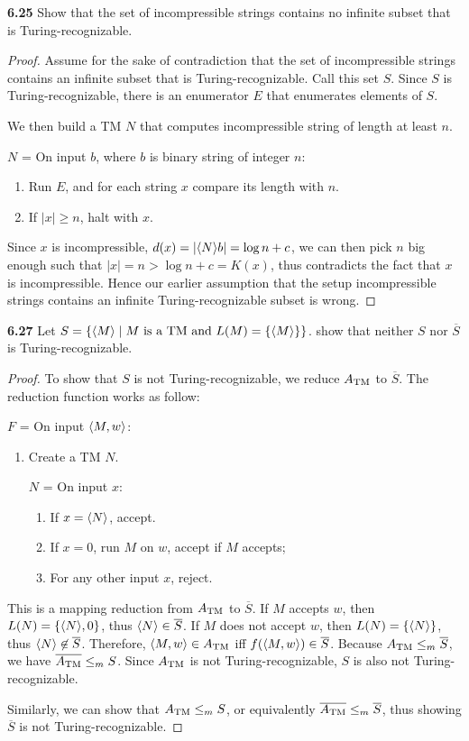 \textbf{6.25} Show that the set of incompressible strings contains no infinite subset that is Turing-recognizable.
\begin{mdframed}
\begin{proof}
Assume for the sake of contradiction that the set of incompressible strings contains an infinite subset that is Turing-recognizable. Call this set $S$. Since $S$ is Turing-recognizable, there is an enumerator $E$ that enumerates elements of $S$.

We then build a TM $N$ that computes incompressible string of length at least $n$.

\medskip
$N$ = On input $b$, where $b$ is binary string of integer $n$:
\begin{enumerate}
\item Run $E$, and for each string $x$ compare its length with $n$.
\item If $|x| \geq n$, halt with $x$.
\end{enumerate}
Since $x$ is incompressible, $d(x) = |\langle{N}\rangle b| = \log n + c$, we can then pick $n$ big enough such that $|x| = n > \log n + c = K(x)$, thus contradicts the fact that $x$ is incompressible. Hence our earlier assumption that the setup incompressible strings contains an infinite Turing-recognizable subset is wrong.
\end{proof}
\end{mdframed}

\textbf{6.27} Let $S = \{\langle{M}\rangle \mid \text{$M$ is a TM and $L(M) = \{\langle{M}\rangle\}$}\}$. show that neither $S$ nor $\overline{S}$ is Turing-recognizable.
\begin{mdframed}
\begin{proof}
To show that $S$ is not Turing-recognizable, we reduce $A_{\text{TM}}$ to $\overline{S}$. The reduction function works as follow:

\medskip
$F$ = On input $\langle{M, w}\rangle$:
\begin{enumerate}
\item Create a TM $N$. 

$N$ = On input $x$:
\begin{enumerate}
\item If $x = \langle{N}\rangle$, accept.
\item If $x = 0$, run $M$ on $w$, accept if $M$ accepts;
\item For any other input $x$, reject.
\end{enumerate}
\end{enumerate}

This is a mapping reduction from $A_{\text{TM}}$ to $\overline{S}$. If $M$ accepts $w$, then $L(N) = \{\langle{N}\rangle,0 \}$, thus $\langle{N}\rangle \in \overline{S}$. If $M$ does not accept $w$, then $L(N) = \{\langle{N}\rangle \}$, thus $\langle{N}\rangle \not \in \overline{S}$. Therefore, $\langle{M, w}\rangle \in A_{\text{TM}}$ iff $f(\langle{M, w}\rangle) \in \overline{S}$. Because $A_{\text{TM}} \leq_m \overline{S}$, we have $\overline{A_{\text{TM}}} \leq_m S$. Since $A_{\text{TM}}$ is not Turing-recognizable, $S$ is also not Turing-recognizable.

\medskip
Similarly, we can show that $A_{\text{TM}} \leq_m S$, or equivalently $\overline{A_{\text{TM}}} \leq_m \overline{S}$, thus showing $\overline{S}$ is not Turing-recognizable.
\end{proof}
\end{mdframed}